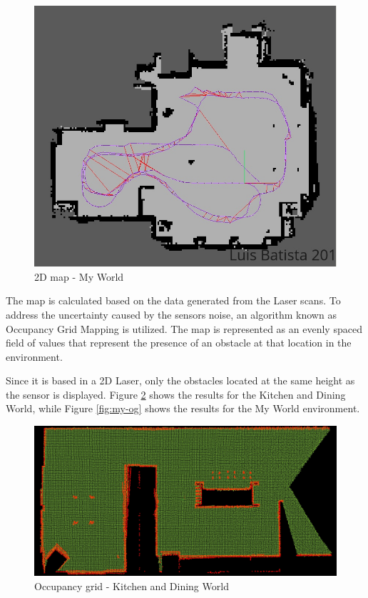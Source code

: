\documentclass[10pt,journal,compsoc]{IEEEtran}
\begin{document}
\begin{figure}[H]
  \centering
  \includegraphics[width=.7\linewidth]{my_world_2d.png}
  \caption{2D map - My World}
  \label{fig:2d-man-mw}
\end{figure}

The map is calculated based on the data generated from the Laser scans. To address the uncertainty caused by the sensors noise, an algorithm known as Occupancy Grid Mapping is utilized. The map is represented as an evenly spaced field of values that represent the presence of an obstacle at that location in the environment.

Since it is based in a 2D Laser, only the obstacles located at the same height as the sensor is displayed. Figure \ref{fig:kd-og} shows the results for the Kitchen and Dining World, while Figure \ref{fig:my-og} shows the results for the My World environment.

\begin{figure}[H]
  \centering
  \includegraphics[width=.9\linewidth]{kd_world_og.png}
  \caption{Occupancy grid - Kitchen and Dining World}
  \label{fig:kd-og}
\end{figure}%
\end{document}
